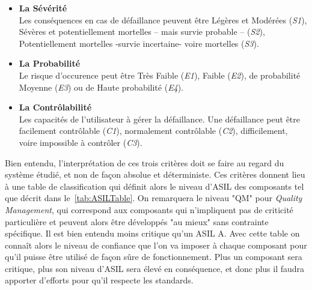 \documentclass[french, a4paper, 11pt, twoside, pdftex]{StyleThese}
\begin{document}
		\begin{itemize}
			\item 		\textbf{La Sévérité}	\\
			Les conséquences en cas de défaillance peuvent être Légères et Modérées (\emph{S1}), Sévères et potentiellement mortelles -- mais survie probable -- (\emph{S2}), Potentiellement mortelles -survie incertaine- voire mortelles (\emph{S3}). 		
			\item 		\textbf{La Probabilité} 	\\
			Le risque d'occurence peut être Très Faible (\emph{E1}), Faible (\emph{E2}), de probabilité Moyenne (\emph{E3}) ou de Haute probabilité (\emph{E4}).
			\item 		\textbf{La Contrôlabilité}	\\
			Les capacités de l'utilisateur à gérer la défaillance. Une défaillance peut être facilement contrôlable (\emph{C1}), normalement contrôlable (\emph{C2}), difficilement, voire impossible à contrôler (\emph{C3}).
		\end{itemize}
		
		Bien entendu, l'interprétation de ces trois critères doit se faire au regard du système étudié, et non de façon absolue et déterministe. 
		Ces critères donnent lieu à une table de classification qui définit alors le niveau d'ASIL des composants tel que décrit dans le~\autoref{tab:ASILTable}. On remarquera le niveau "QM" pour \textit{Quality Management}, qui correspond aux composants qui n'impliquent pas de criticité particulière et peuvent alors être développés "au mieux" sans contrainte spécifique. Il est bien entendu moins critique qu'un ASIL A. Avec cette table on connaît alors le niveau de confiance que l'on va imposer à chaque composant pour qu'il puisse être utilisé de façon sûre de fonctionnement. Plus un composant sera critique, plus son niveau d'ASIL sera élevé en conséquence, et donc plus il faudra apporter d'efforts pour qu'il respecte les standards.
		
\end{document}
